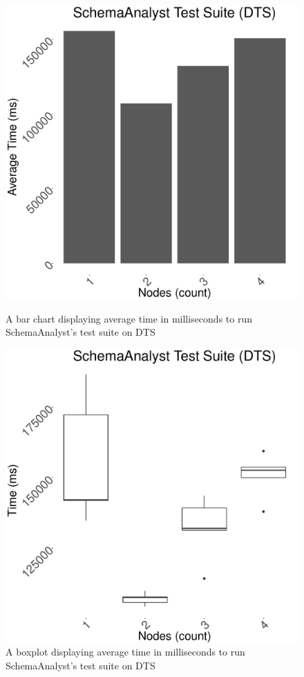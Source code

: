 \documentclass{article}
\begin{document}
{\begin{figure}[!ht]
  \centering
  \begin{minipage}[b]{0.4\textwidth}
    \includegraphics[width=\textwidth]{../data/graphs/sa_bar_dts.pdf}
    \caption{A bar chart displaying average time in milliseconds to run SchemaAnalyst's test suite on DTS}
    \label{sabardts}
  \end{minipage}
  \hfill
  \begin{minipage}[b]{0.4\textwidth}
    \includegraphics[width=\textwidth]{../data/graphs/sa_boxplot_dts.pdf}
    \caption{A boxplot displaying average time in milliseconds to run SchemaAnalyst's test suite on DTS}
    \label{saboxdts}
  \end{minipage}
\end{figure}

}
\end{document}
